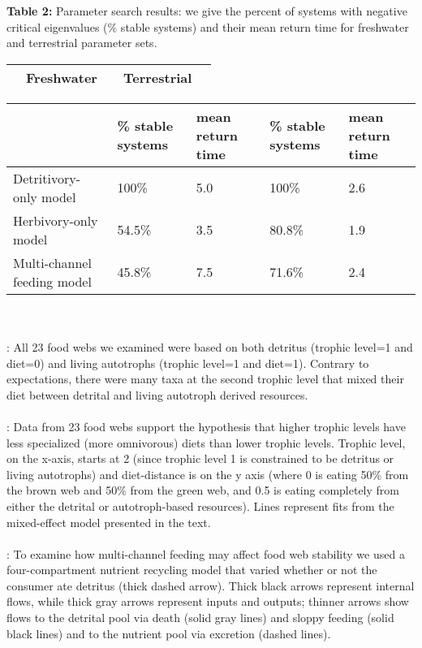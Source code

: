\documentclass[12pt,a4paper,oneside]{article}
\begin{document}
\newpage
\noindent \textbf{Table 2:} Parameter search results: we give the percent of systems with negative critical eigenvalues (\% stable systems) and their mean return time for freshwater and terrestrial parameter sets.
\begin{center}
{\footnotesize 
  \begin{tabular}{| p{4.5cm} | p{2cm}  p{2cm} || p{2cm} p{2cm} |  }   
\hline \hline
 & Freshwater & & Terrestrial  &\\ \hline
\end{tabular}
  \begin{tabular}{ | p{4.5cm} |  p{2cm} | p{2cm} || p{2cm} | p{2cm} | }   
\hline \hline
 & \% stable systems & mean return time & \% stable systems & mean return time \\ \hline
Detritivory-only model & 100\% & 5.0 & 100\% & 2.6 \\ \hline
Herbivory-only model & 54.5\% & 3.5 & 80.8\% & 1.9\\ \hline
Multi-channel feeding model & 45.8\% & 7.5 & 71.6\% & 2.4 \\ \hline
\end{tabular}}
\end{center}


\newpage
{}\\

\\
: All 23 food webs we examined were based on
both detritus (trophic level=1 and diet=0) and living autotrophs
(trophic level=1 and diet=1). Contrary to expectations, there were
many taxa at the second trophic level that mixed their diet between
detrital and living autotroph derived resources. \\
\\
: Data from 23 food webs support the
hypothesis that higher trophic levels have less specialized
(more omnivorous) diets than lower trophic levels. Trophic level, on
the x-axis, starts at 2 (since trophic level 1 is constrained to be
detritus or living autotrophs) and diet-distance is on the y axis
(where 0 is eating 50\% from the brown web and 50\% from the green web, and 0.5 is
eating completely from either the detrital or autotroph-based
resources). Lines represent fits from the mixed-effect model presented
in the text.\\
\\
: To examine how multi-channel feeding may
affect food web stability we used a four-compartment nutrient recycling
model that varied whether or not the consumer ate detritus (thick dashed
arrow). Thick black arrows represent internal flows, while thick gray arrows
represent inputs and outputs; thinner arrows show flows
to the detrital pool via death (solid gray lines) and sloppy feeding (solid black lines) and to the nutrient
pool via excretion (dashed lines). \\
\end{document}
